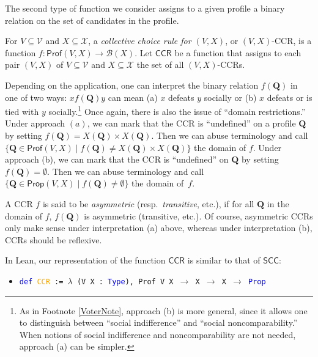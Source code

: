 \documentclass[runningheads]{llncs}
\begin{document}
The second type of function we consider assigns to a given profile a binary relation on the set of candidates in the profile. %

\begin{definition}\textnormal{For $V\subseteq\mathcal{V}$ and $X\subseteq\mathcal{X}$, a \textit{collective choice rule for $(V,X)$}, or $(V,X)$-CCR, is a function  $f: \mathsf{Prof}(V,X)\to \mathcal{B}(X)$. Let $\mathsf{CCR}$ be a function that assigns to each pair $(V,X)$ of $V\subseteq\mathcal{V}$ and $X\subseteq\mathcal{X}$ the set of all $(V,X)$-CCRs.}\end{definition}

\noindent Depending on the application, one can interpret the binary relation $f(\mathbf{Q})$ in one of two ways: $xf(\mathbf{Q})y$ can mean (a) $x$ defeats $y$ socially or (b) $x$ defeats or is tied with $y$ socially.\footnote{As in Footnote \ref{VoterNote}, approach (b) is more general, since it allows one to distinguish between ``social indifference'' and ``social noncomparability.'' When notions of social indifference and noncomparability are not needed, approach (a) can be simpler.} Once again, there is also the issue of ``domain restrictions.'' Under approach $(a)$, we can mark that the CCR is ``undefined'' on a profile $\mathbf{Q}$ by setting $f(\mathbf{Q})= X(\mathbf{Q})\times X(\mathbf{Q})$. Then we can abuse terminology and call $\{\mathbf{Q}\in\mathsf{Prof}(V,X)\mid f(\mathbf{Q})\neq X(\mathbf{Q})\times X(\mathbf{Q}) \}$ the domain of $f$. Under approach (b), we can mark that the CCR is ``undefined'' on $\mathbf{Q}$ by setting $f(\mathbf{Q})=\emptyset$. Then we can abuse terminology and call $\{\mathbf{Q}\in\mathsf{Prop}(V,X)\mid f(\mathbf{Q})\neq \emptyset\}$ the domain of~$f$. 

A CCR $f$ is said to be \textit{asymmetric} (resp.~\textit{transitive}, etc.), if for all $\mathbf{Q}$ in the domain of $f$, $f(\mathbf{Q})$ is asymmetric (transitive, etc.). Of course, asymmetric CCRs only make sense under interpretation (a) above, whereas under interpretation (b), CCRs should be reflexive.

In Lean, our representation of the function $\mathsf{CCR}$ is similar to that of $\mathsf{SCC}$:
\begin{itemize}
\item[] \texttt{\textcolor{blue}{def} \textcolor{orange}{CCR} := $\lambda$ (V X : \textcolor{blue}{Type}), Prof V X $\to$ X $\to$ X $\to$ \textcolor{blue}{Prop}}
\end{itemize}
\end{document}
